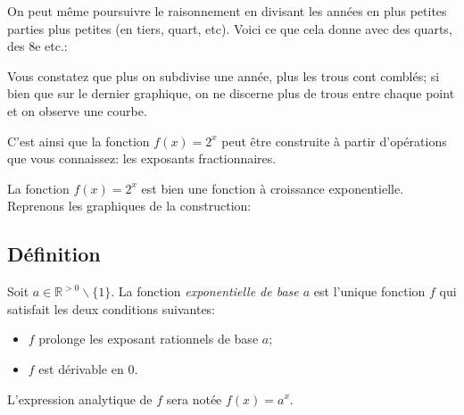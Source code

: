 \documentclass[a4paper,12pt,singlepage]{report}
\newcommand{\IR}{\mathbb{R}}
\begin{document}
On peut même poursuivre le raisonnement en divisant les années en plus petites
parties plus petites (en tiers, quart, etc). Voici ce que cela donne avec des
quarts, des 8e etc.:

\par \setlength{\columnseprule}{0 pt}
          \begin{minipage}[t]{\linewidth}
          \begin{multicols}{2}



\columnbreak






\end{multicols}\end{minipage}

Vous constatez que plus on subdivise une année, plus les trous cont comblés; si
bien que sur le dernier graphique, on ne discerne plus de trous entre chaque
point et on observe une courbe.

C'est ainsi que la fonction \(f(x)=2^x\) peut être construite à partir
d'opérations que vous connaissez: les exposants fractionnaires.

La fonction \(f(x)=2^x\) est bien une fonction à croissance
exponentielle. Reprenons les graphiques de la construction:
\begin{center}

\end{center}

\newpage
\subsection{Définition}
\label{sec:org64a06f6}
\begin{definition}
Soit \(a\in\IR^{>0}\backslash\{1\}\). La fonction \emph{exponentielle de base \(a\)} est
l'unique fonction \(f\) qui satisfait les deux conditions suivantes:
\begin{itemize}
\item \(f\) prolonge les exposant rationnels de base \(a\);
\item \(f\) est dérivable en \(0\).
\end{itemize}

L'expression analytique de \(f\) sera notée \(f(x)=a^x\).
\end{definition}
\end{document}
